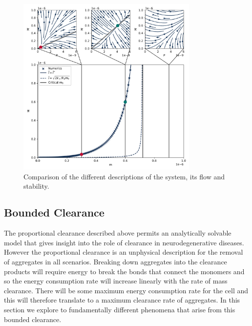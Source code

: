 \begin{figure}
    \centering
    \includegraphics[width=0.8\textwidth]{figures/propClearSummary.pdf}
    \caption{Comparison of the different descriptions of the system, its flow and stability.}
    \label{fig:4-steadyConstClear}
\end{figure}

\subsection{Bounded Clearance}\label{subsec:4-boundedclearance}

The proportional clearance described above permits an analytically solvable model that gives insight into the role of clearance in neurodegenerative diseases. However the proportional clearance is an unphysical description for the removal of aggregates in all scenarios. Breaking down aggregates into the clearance products will require energy to break the bonds  that connect the monomers and so the energy consumption rate will increase linearly with the rate of mass clearance. There will be some maximum energy consumption rate for the cell and this will therefore translate to a maximum clearance rate of aggregates. In this section we explore to fundamentally different phenomena that arise from this bounded clearance.


